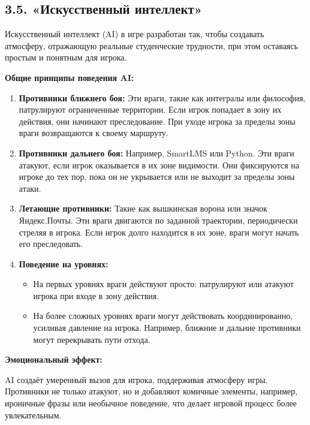 \subsection*{3.5. «Искусственный интеллект»}

Искусственный интеллект (AI) в игре разработан так, чтобы создавать атмосферу, отражающую реальные студенческие трудности, при этом оставаясь простым и понятным для игрока.

\textbf{Общие принципы поведения AI:}

\begin{enumerate}
    \item \textbf{Противники ближнего боя:}  
    Эти враги, такие как интегралы или философия, патрулируют ограниченные территории. Если игрок попадает в зону их действия, они начинают преследование. При уходе игрока за пределы зоны враги возвращаются к своему маршруту.  

    \item \textbf{Противники дальнего боя:}  
    Например, SmartLMS или Python. Эти враги атакуют, если игрок оказывается в их зоне видимости. Они фиксируются на игроке до тех пор, пока он не укрывается или не выходит за пределы зоны атаки.  

    \item \textbf{Летающие противники:}  
    Такие как вышкинская ворона или значок Яндекс.Почты. Эти враги двигаются по заданной траектории, периодически стреляя в игрока. Если игрок долго находится в их зоне, враги могут начать его преследовать.  

    \item \textbf{Поведение на уровнях:}  
    \begin{itemize}
        \item На первых уровнях враги действуют просто: патрулируют или атакуют игрока при входе в зону действия.  
        \item На более сложных уровнях враги могут действовать координированно, усиливая давление на игрока. Например, ближние и дальние противники могут перекрывать пути отхода.  
    \end{itemize}
\end{enumerate}

\textbf{Эмоциональный эффект:}

AI создаёт умеренный вызов для игрока, поддерживая атмосферу игры. Противники не только атакуют, но и добавляют комичные элементы, например, ироничные фразы или необычное поведение, что делает игровой процесс более увлекательным.